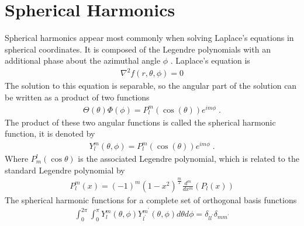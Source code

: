         \section{Spherical Harmonics} \label{sec:Spherical_Harmonics}
        Spherical harmonics appear most commonly when solving Laplace's equations in spherical coordinates. It is composed of the Legendre polynomials with an additional phase about the azimuthal angle $\phi$ \cite{Riley_Hobson_Bence_2006}. Laplace's equation is 
        \begin{align}
            \nabla^2 f(r, \theta, \phi) = 0
        \end{align}
        \noindent The solution to this equation is separable, so the angular part of the solution can be written as a product of two functions 
        \begin{align}
            \Theta (\theta) \Phi(\phi) = P^m_l(\cos(\theta)) e^{im\phi}\;.
        \end{align}
        \noindent The product of these two angular functions is called the spherical harmonic function, it is denoted by 
        \begin{align}
            Y^m_l (\theta, \phi) = P^m_l(\cos(\theta)) e^{im\phi}\;.
        \end{align}
        \noindent Where $P^l_m(\cos \theta)$ is the associated Legendre polynomial, which is related to the standard Legendre polynomial by 
        \begin{align}
            P^m_l(x) = (-1)^m (1-x^2)^{\frac{m}{2}} \frac{d^m}{dx^m} \left(P_l(x) \right)
        \end{align}
        The spherical harmonic functions for a complete set of orthogonal basis functions 
        \begin{align}
            \int_0^{2\pi} \int_0^\pi Y^m_l(\theta, \phi) Y^{m^\prime}_{l^\prime}(\theta, \phi) d\theta d\phi = \delta_{ll^\prime}\delta_{mm^\prime}
        \end{align}
        \begin{table}[h]
            \centering 
            \caption{Table of the first few spherical harmonic functions}
            \label{tab:spherical_harmonic}
        \end{table}
